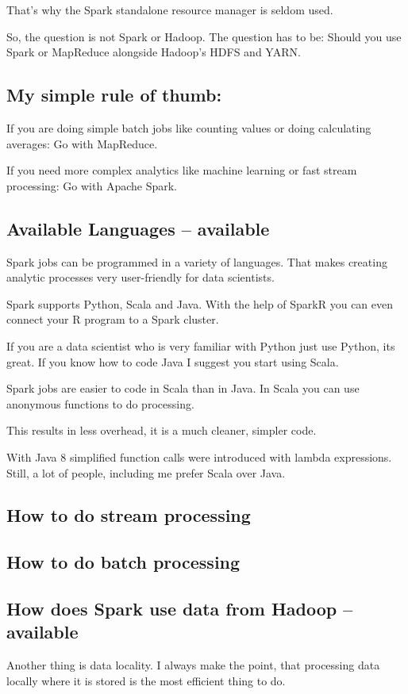 \documentclass[12pt, numbers=noenddot]{scrreprt} %
\begin{document}
That’s why the Spark standalone resource manager is seldom used.

So, the question is not Spark or Hadoop. The question has to be: Should you use Spark or MapReduce alongside Hadoop’s HDFS and YARN.

\subsection{My simple rule of thumb:}

If you are doing simple batch jobs like counting values or doing calculating averages: Go with MapReduce.

If you need more complex analytics like machine learning or fast stream processing: Go with Apache Spark.

\subsection{Available Languages -- available}

Spark jobs can be programmed in a variety of languages. That makes creating analytic processes very user-friendly for data scientists.

Spark supports Python, Scala and Java. With the help of SparkR you can even connect your R program to a Spark cluster.

If you are a data scientist who is very familiar with Python just use Python, its great. If you know how to code Java I suggest you start using Scala.

Spark jobs are easier to code in Scala than in Java. In Scala you can use anonymous functions to do processing.

This results in less overhead, it is a much cleaner, simpler code.

With Java 8 simplified function calls were introduced with lambda expressions. Still, a lot of people, including me prefer Scala over Java.

\subsection{How to do stream processing}
\subsection{How to do batch processing}
\subsection{How does Spark use data from Hadoop -- available}
Another thing is data locality. I always make the point, that processing data locally where it is stored is the most efficient thing to do.
\end{document}
